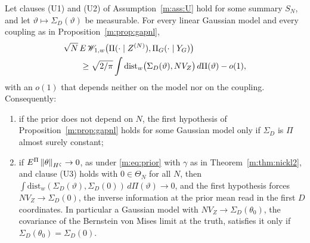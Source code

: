 \begin{proposition}\label{m:prop:gapreq}
Let clauses (U1) and (U2) of Assumption~\ref{m:ass:U} hold for some summary $S_N$, and let $\vartheta\mapsto\Sigma_D(\vartheta)$ be measurable. For every linear Gaussian model and every coupling as in Proposition~\ref{m:prop:gapnl},
\[
\begin{aligned}
&\sqrt N\,E\,\mathscr{W}_{1,w}\big(\Pi(\cdot\mid Z^{(N)}),\Pi_G(\cdot\mid Y_G)\big)\\
&\qquad\ge\sqrt{2/\pi}\int\mathrm{dist}_w\big(\Sigma_D(\vartheta),NV_Z\big)\,d\Pi(\vartheta)-o(1),
\end{aligned}
\]
with an $o(1)$ that depends neither on the model nor on the coupling. Consequently:
\begin{enumerate}[label=(\roman*),nosep]
\item if the prior does not depend on $N$, the first hypothesis of Proposition~\ref{m:prop:gapnl} holds for some Gaussian model only if $\Sigma_D$ is $\Pi$ almost surely constant;
\item if $E^\Pi\left\|\theta\right\|_{H^\zeta}\to0$, as under \eqref{m:eq:prior} with $\gamma$ as in Theorem~\ref{m:thm:nickl2}, and clause (U3) holds with $0\in\Theta_N$ for all $N$, then $\int\mathrm{dist}_w(\Sigma_D(\vartheta),\Sigma_D(0))\,d\Pi(\vartheta)\to0$, and the first hypothesis forces $NV_Z\to\Sigma_D(0)$, the inverse information at the prior mean read in the first $D$ coordinates. In particular a Gaussian model with $NV_Z\to\Sigma_D(\theta_0)$, the covariance of the Bernstein von Mises limit at the truth, satisfies it only if $\Sigma_D(\theta_0)=\Sigma_D(0)$.
\end{enumerate}
\end{proposition}

